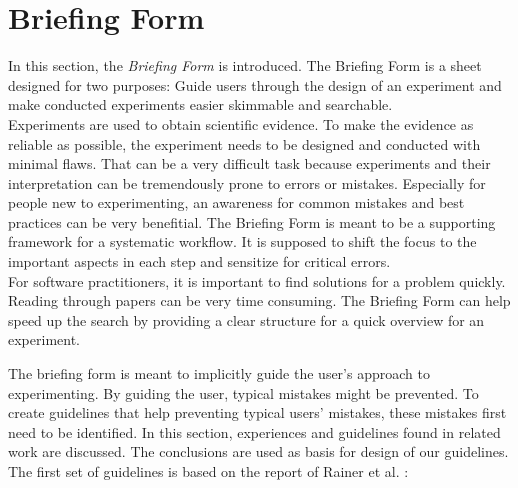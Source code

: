 

\section{Briefing Form}
In this section, the \textit{Briefing Form} is introduced. The Briefing Form is a sheet designed for two purposes: Guide users through the design of an experiment and make conducted experiments easier skimmable and searchable.\\
Experiments are used to obtain scientific evidence. To make the evidence as reliable as possible, the experiment needs to be designed and conducted with minimal flaws. That can be a very difficult task because experiments and their interpretation can be tremendously prone to errors or mistakes. Especially for people new to experimenting, an awareness for common mistakes and best practices can be very benefitial.
The Briefing Form is meant to be a  supporting framework for a systematic workflow. It is supposed to shift the focus to the important aspects in each step and sensitize for critical errors.\\
For software practitioners, it is important to find solutions for a problem quickly. Reading through papers can be very time consuming. The Briefing Form can help speed up the search by providing a clear structure for a quick overview for an experiment.

The briefing form is meant to implicitly guide the user's approach to experimenting.
By guiding the user, typical mistakes might be prevented.
To create guidelines that help preventing typical users' mistakes, these mistakes first need to be identified.
In this section, experiences and guidelines found in related work are discussed.
The conclusions are used as basis for design of our guidelines.
The first set of guidelines is based on the report of Rainer et al. \cite{Rainer2006}: